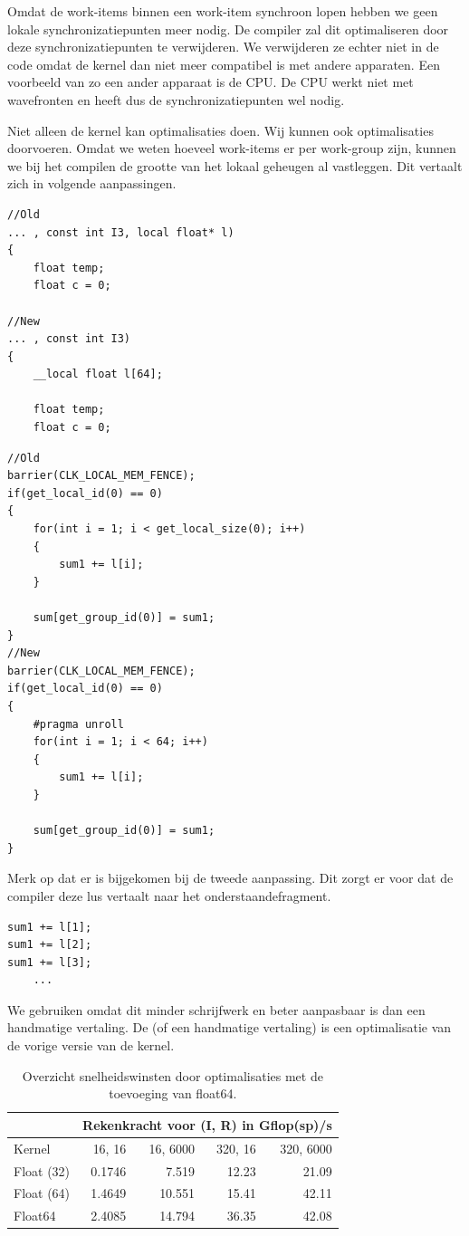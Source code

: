 Omdat de work-items binnen een work-item synchroon lopen hebben we geen lokale synchronizatiepunten meer nodig. De compiler zal dit optimaliseren door deze synchronizatiepunten te verwijderen. We verwijderen ze echter niet in de code omdat de kernel dan niet meer compatibel is met andere apparaten. Een voorbeeld van zo een ander apparaat is de CPU. De CPU werkt niet met wavefronten en heeft dus de synchronizatiepunten wel nodig.

Niet alleen de kernel kan optimalisaties doen. Wij kunnen ook optimalisaties doorvoeren. Omdat we weten hoeveel work-items er per work-group zijn, kunnen we bij het compilen de grootte van het lokaal geheugen al vastleggen. Dit vertaalt zich in volgende aanpassingen.

\begin{lstlisting}
//Old
... , const int I3, local float* l)
{
    float temp;
    float c = 0;

//New
... , const int I3)
{
    __local float l[64];
    
    float temp;
    float c = 0;
\end{lstlisting}
\begin{lstlisting}
//Old
barrier(CLK_LOCAL_MEM_FENCE);
if(get_local_id(0) == 0)
{        
    for(int i = 1; i < get_local_size(0); i++)
    {
        sum1 += l[i];
    }
    
    sum[get_group_id(0)] = sum1;
}
//New
barrier(CLK_LOCAL_MEM_FENCE);
if(get_local_id(0) == 0)
{        
    #pragma unroll
    for(int i = 1; i < 64; i++)
    {
        sum1 += l[i];
    }
    
    sum[get_group_id(0)] = sum1;
}
\end{lstlisting}

Merk op dat er  is bijgekomen bij de tweede aanpassing. Dit zorgt er voor dat de compiler deze lus vertaalt naar het onderstaandefragment. 
\begin{lstlisting}
sum1 += l[1];
sum1 += l[2];
sum1 += l[3];
    ...
\end{lstlisting}
We gebruiken  omdat dit minder schrijfwerk en beter aanpasbaar is dan een handmatige vertaling. De  (of een handmatige vertaling) is een optimalisatie van de vorige versie van de kernel.

\begin{table}
	\centering
    \begin{tabular}{|l| r|r| r |r|}
		\hline
						& \multicolumn{4}{c|}{Rekenkracht voor (I, R) in Gflop(sp)/s}\\
		\hline
		Kernel          & 16, 16 	& 16, 6000	& 320, 16	&  320, 6000 \\
		\hline
		Float (32)      & 0.1746  	& 7.519   	& 12.23 	& 21.09 	\\
		Float (64)      & 1.4649	& 10.551  	& 15.41  	& 42.11  	\\
		Float64         & 2.4085 	& 14.794  	& 36.35 	& 42.08 	\\
		\hline
    \end{tabular}
    \caption{\label{measF64} Overzicht snelheidswinsten door optimalisaties met de toevoeging van float64.}
\end{table}

